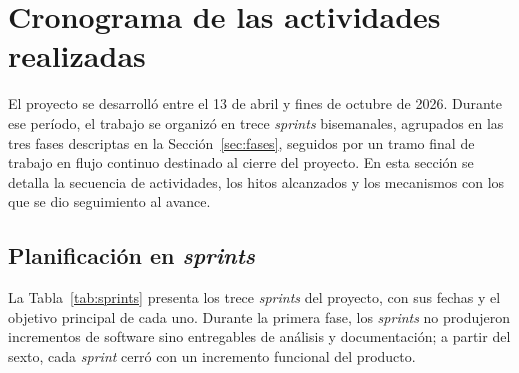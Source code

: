 \section{Cronograma de las actividades realizadas}\label{sec:cronograma}

El proyecto se desarrolló entre el 13 de abril y fines de octubre de 2026. Durante ese período, el trabajo se organizó en trece \textit{sprints} bisemanales, agrupados en las tres fases descriptas en la Sección~\ref{sec:fases}, seguidos por un tramo final de trabajo en flujo continuo destinado al cierre del proyecto. En esta sección se detalla la secuencia de actividades, los hitos alcanzados y los mecanismos con los que se dio seguimiento al avance.

\subsection{Planificación en \textit{sprints}}

La Tabla~\ref{tab:sprints} presenta los trece \textit{sprints} del proyecto, con sus fechas y el objetivo principal de cada uno. Durante la primera fase, los \textit{sprints} no produjeron incrementos de software sino entregables de análisis y documentación; a partir del sexto, cada \textit{sprint} cerró con un incremento funcional del producto.

